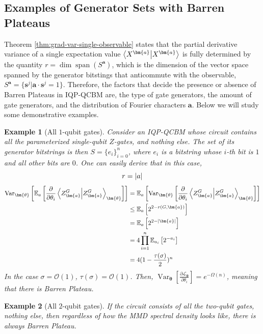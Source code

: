 \documentclass[a4paper,onecolumn,notitlepage,nofootinbib,longbibliography,superscriptaddress, floatfix, pra, aps, 10pt]{revtex4-2}
\newcommand{\vttheta}{{\bm{\theta}}}
\newcommand{\vta}{{\bm{a}}}
\newcommand{\vtsj}{{\bm{s}^j}}
\newtheorem{example}{Example}
\begin{document}
\subsection{Examples of Generator Sets with Barren Plateaus}
Theorem \ref{thm:grad-var-single-observable} states that the partial derivative variance of a single expectation value $\braket{X^\vta}$ is fully determined by the quantity $r = \dim \operatorname{span}\left( S^{\vta} \right)$, which is the dimension of the vector space spanned by the generator bitstings that anticommute with the observable, $S^\vta = \{\vtsj \vert \vta \cdot \vtsj = 1\}$. Therefore, the factors that decide the presence or absence of Barren Plateaus in IQP-QCBM are, the type of gate generators, the amount of gate generators, and the distribution of Fourier characters $\vta$. Below we will study some demonstrative examples.
\begin{example}[All $1$-qubit gates] Consider an IQP-QCBM whose circuit contains all the parameterized single-qubit $Z$-gates, and nothing else. The set of its generator bitstrings is then $S=\{e_i\}_{i=0}^n$, where $e_i$ is a bitstring whose $i$-th bit is $1$ and all other bits are $0$. One can easily derive that in this case, \begin{equation}r = \abs{a} \end{equation} 
\begin{align}
    \operatorname{Var}_\vttheta \left[\mathbb{E}_a\left[\frac{\partial}{\partial \theta_i} \braket{Z^G_\vta}_\vttheta \right]
 \right] &= \mathbb{E}_a\left[\operatorname{Var}_\vttheta \left[\frac{\partial}{\partial \theta_i} \braket{Z^G_\vta}_\vttheta \right]
 \right]  \label{variance 1: eq}\\
 & \leq \mathbb{E}_a \left[2^{2-r(G,\vta)} \right] \label{variance 2: eq}\\
 & = \mathbb{E}_a \left[2^{2-\abs{\vta}} \right] \\
 & = 4 \prod_{i=1}^{n} \mathbb{E}_{a_i}\left[2^{-a_i} \right] \\
 & = 4 (1-\frac{\tau(\sigma)}{2})^n
\end{align}
In the case $\sigma = \mathcal{O}(1)$, $\tau(\sigma) = \mathcal{O}(1)$. Then, $\operatorname{Var}_\vttheta \left[\frac{\partial \mathcal{L}_\vttheta}{\partial \theta_i}\right] = e^{-\Omega(n)}$, meaning that there is Barren Plateau.
\end{example}

\begin{example}[All $2$-qubit gates] If the circuit consists of all the two-qubit gates, nothing else, then regardless of how the MMD spectral density looks like, there is always Barren Plateau.
\end{example}
\end{document}
